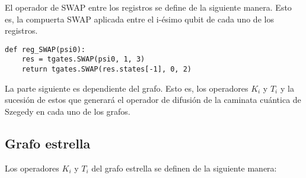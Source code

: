 El operador de SWAP entre los registros se define de la siguiente manera. Esto es, la compuerta SWAP aplicada entre el i-ésimo qubit de cada uno de los registros.

\begin{verbatim}
def reg_SWAP(psi0):
    res = tgates.SWAP(psi0, 1, 3)
    return tgates.SWAP(res.states[-1], 0, 2)
\end{verbatim}

La parte siguiente es dependiente del grafo. Esto es, los operadores $K_i$ y $T_i$ y la sucesión de estos que generará el operador de difusión de la caminata cuántica de Szegedy en cada uno de los grafos.

\subsection{Grafo estrella}

Los operadores $K_i$ y $T_i$ del grafo estrella se definen de la siguiente manera:

